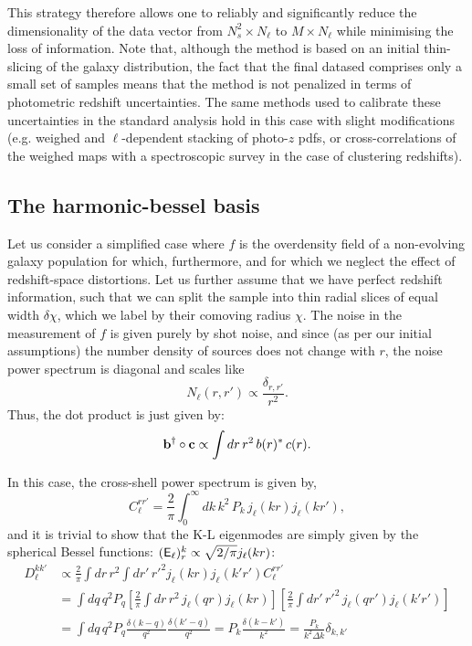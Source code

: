 \documentclass[a4paper,10pt]{article}
\begin{document}
  This strategy therefore allows one to reliably and significantly reduce the dimensionality of the data vector from $N_s^2\times N_\ell$ to $M\times N_\ell$ while minimising the loss of information. Note that, although the method is based on an initial thin-slicing of the galaxy distribution, the fact that the final datased comprises only a small set of samples means that the method is not penalized in terms of photometric redshift uncertainties. The same methods used to calibrate these uncertainties in the standard analysis hold in this case with slight modifications (e.g. weighed and $\ell$-dependent stacking of photo-$z$ pdfs, or cross-correlations of the weighed maps with a spectroscopic survey in the case of clustering redshifts).
  
  \subsection{The harmonic-bessel basis}
    Let us consider a simplified case where $f$ is the overdensity field of a non-evolving galaxy population for which, furthermore, and for which we neglect the effect of redshift-space distortions. Let us further assume that we have perfect redshift information, such that we can split the sample into thin radial slices of equal width $\delta \chi$, which we label by their comoving radius $\chi$. The noise in the measurement of $f$ is given purely by shot noise, and since (as per our initial assumptions) the number density of sources does not change with $r$, the noise power spectrum is diagonal and scales like 
    \begin{equation}
      N_\ell(r,r')\propto \frac{\delta_{r,r'}}{r^2}.
    \end{equation}
    Thus, the dot product is just given by:
    \begin{equation}
      {\bf b}^\dag\circ{\bf c}\propto\int dr\,r^2\,b(r)^*\,c(r).
    \end{equation}
    
    In this case, the cross-shell power spectrum is given by,
    \begin{equation}
      C_\ell^{rr'}=\frac{2}{\pi}\int_0^\infty dk\,k^2\,P_k\,j_\ell(kr)j_\ell(kr'),
    \end{equation}
    and it is trivial to show that the K-L eigenmodes are simply given by the spherical Bessel functions: $({\sf E}_\ell)^k_r\propto \sqrt{2/\pi}j_\ell(kr)$:
    \begin{align}
      D_\ell^{kk'}&\propto\frac{2}{\pi}\int dr\,r^2\int dr'\,r'^2 j_\ell(kr)j_\ell(k'r') C_\ell^{rr'}\\
      &=\int dq\,q^2P_q\left[\frac{2}{\pi}\int dr\,r^2\,j_\ell(qr)j_\ell(kr)\right]\left[\frac{2}{\pi}\int dr'\,r'^2\,j_\ell(qr')j_\ell(k'r')\right]\\
      &=\int dq\,q^2P_q\frac{\delta(k-q)}{q^2}\frac{\delta(k'-q)}{q^2}=P_k\frac{\delta(k-k')}{k^2}=\frac{P_k}{k^2\Delta k}\delta_{k,k'}
   \end{align}
   
\end{document}
